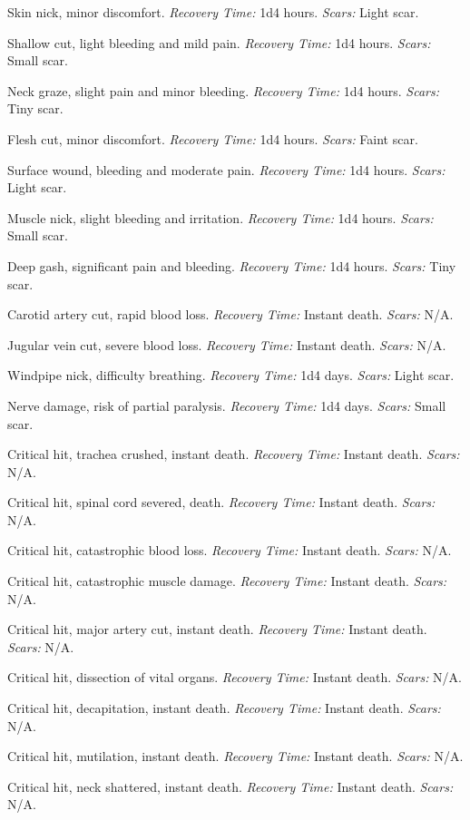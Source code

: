 \begin{description}[labelwidth=1.5em, leftmargin=*, itemsep=0.4em]
    \item[1 -] Skin nick, minor discomfort. \textit{Recovery Time:} 1d4 hours. \textit{Scars:} Light scar.
    \item[2 -] Shallow cut, light bleeding and mild pain. \textit{Recovery Time:} 1d4 hours. \textit{Scars:} Small scar.
    \item[3 -] Neck graze, slight pain and minor bleeding. \textit{Recovery Time:} 1d4 hours. \textit{Scars:} Tiny scar.
    \item[4 -] Flesh cut, minor discomfort. \textit{Recovery Time:} 1d4 hours. \textit{Scars:} Faint scar.
    \item[5 -] Surface wound, bleeding and moderate pain. \textit{Recovery Time:} 1d4 hours. \textit{Scars:} Light scar.
    \item[6 -] Muscle nick, slight bleeding and irritation. \textit{Recovery Time:} 1d4 hours. \textit{Scars:} Small scar.
    \item[7 -] Deep gash, significant pain and bleeding. \textit{Recovery Time:} 1d4 hours. \textit{Scars:} Tiny scar.
    \item[8 -] Carotid artery cut, rapid blood loss. \textit{Recovery Time:} Instant death. \textit{Scars:} N/A.
    \item[9 -] Jugular vein cut, severe blood loss. \textit{Recovery Time:} Instant death. \textit{Scars:} N/A.
    \item[10 -] Windpipe nick, difficulty breathing. \textit{Recovery Time:} 1d4 days. \textit{Scars:} Light scar.
    \item[11 -] Nerve damage, risk of partial paralysis. \textit{Recovery Time:} 1d4 days. \textit{Scars:} Small scar.
    \item[12 -] Critical hit, trachea crushed, instant death. \textit{Recovery Time:} Instant death. \textit{Scars:} N/A.
    \item[13 -] Critical hit, spinal cord severed, death. \textit{Recovery Time:} Instant death. \textit{Scars:} N/A.
    \item[14 -] Critical hit, catastrophic blood loss. \textit{Recovery Time:} Instant death. \textit{Scars:} N/A.
    \item[15 -] Critical hit, catastrophic muscle damage. \textit{Recovery Time:} Instant death. \textit{Scars:} N/A.
    \item[16 -] Critical hit, major artery cut, instant death. \textit{Recovery Time:} Instant death. \textit{Scars:} N/A.
    \item[17 -] Critical hit, dissection of vital organs. \textit{Recovery Time:} Instant death. \textit{Scars:} N/A.
    \item[18 -] Critical hit, decapitation, instant death. \textit{Recovery Time:} Instant death. \textit{Scars:} N/A.
    \item[19 -] Critical hit, mutilation, instant death. \textit{Recovery Time:} Instant death. \textit{Scars:} N/A.
    \item[20 -] Critical hit, neck shattered, instant death. \textit{Recovery Time:} Instant death. \textit{Scars:} N/A.
\end{description}

